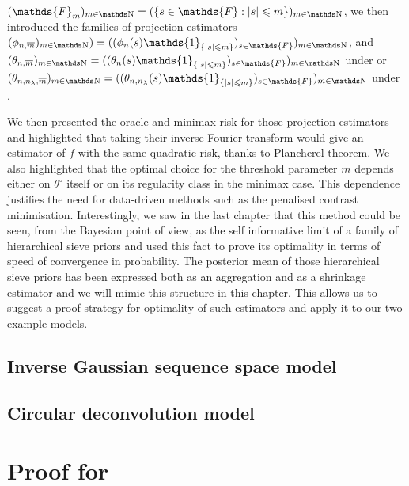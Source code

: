 \documentclass[a4paper,11pt]{book}
\begin{document}
$(\mathds{F}_{m})_{m \in \N} = (\{ s \in \mathds{F}: \vert s \vert \leq m\})_{m \in \N}$, we then introduced the families of projection estimators $(\phi_{n, \overline{m}})_{m \in \N}) =  ((\phi_{n}(s) \mathds{1}_{\{\vert s \vert \leq m\}})_{s \in \mathds{F}})_{m \in \N}$, and $(\theta_{n, \overline{m}})_{m \in \N} = ((\theta_{n}(s) \mathds{1}_{\{\vert s \vert \leq m\}})_{s \in \mathds{F}})_{m \in \N}$ under  or $(\theta_{n, n_{\lambda}, \overline{m}})_{m \in \N} = ((\theta_{n, n_{\lambda}}(s) \mathds{1}_{\{\vert s \vert \leq m\}})_{s \in \mathds{F}})_{m \in \N}$ under .

We then presented the oracle and minimax risk for those projection estimators and highlighted that taking their inverse Fourier transform would give an estimator of $f$ with the same quadratic risk, thanks to Plancherel theorem.
We also highlighted that the optimal choice for the threshold parameter $m$ depends either on $\theta^{\circ}$ itself or on its regularity class in the minimax case.
This dependence justifies the need for data-driven methods such as the penalised contrast minimisation.
Interestingly, we saw in the last chapter that this method could be seen, from the Bayesian point of view, as the self informative limit of a family of hierarchical sieve priors and used this fact to prove its optimality in terms of speed of convergence in probability.
The posterior mean of those hierarchical sieve priors has been expressed both as an aggregation and as a shrinkage estimator and we will mimic this structure in this chapter.
This allows us to suggest a proof strategy for optimality of such estimators and apply it to our two example models.



\section{Inverse Gaussian sequence space model}\label{FREQ_IGSSM}\label{FREQ_GAUSS}

\section{Circular deconvolution model}\label{FREQ_CIRCULARDECONVOLUTION}


\appendix


\chapter{Proof for \textsc{}}\label{PROOF_BAYES_IGSSM}
\end{document}
